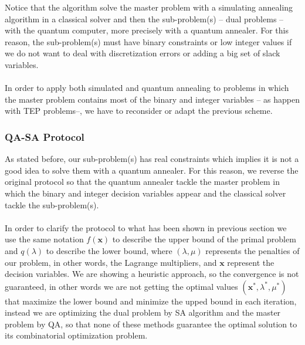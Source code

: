 Notice that the algorithm solve the master problem with a simulating annealing algorithm in a classical solver and then the sub-problem(s) -- dual problems -- with the quantum computer, more precisely with a quantum annealer. For this reason, the sub-problem(s) must have binary constraints or low integer values if we do not want to deal with discretization errors or adding a big set of slack variables.\\\\
In order to apply both simulated and quantum annealing to problems in which the master problem contains most of the binary and integer variables -- as happen with TEP problems--, we have to reconsider or adapt the previous scheme.
\subsubsection{QA-SA Protocol}
 As stated before, our sub-problem(s) has real constraints which implies it is not a good idea to solve them with a quantum annealer. For this reason, we reverse the original protocol so that the quantum annealer tackle the master problem in which the binary and integer decision variables appear and the classical solver tackle the sub-problem(s).\\\\
In order to clarify the protocol to what has been shown in previous section we use the same notation $f(\textbf{x})$ to describe the upper bound of the primal problem and $q(\lambda)$ to describe the lower bound, where $(\lambda,\mu)$ represents the penalties of our problem, in other words, the Lagrange multipliers, and $\textbf{x}$ represent the decision variables. We are showing a heuristic approach, so the convergence is not guaranteed, in other words we are not getting the optimal values $(\textbf{x}^{*}, \lambda^{*},\mu^{*})$ that maximize the lower bound and minimize the upped bound in each iteration, instead we are optimizing the dual problem by SA algorithm and the master problem by QA, so that none of these methods guarantee the optimal solution to its combinatorial optimization problem.
